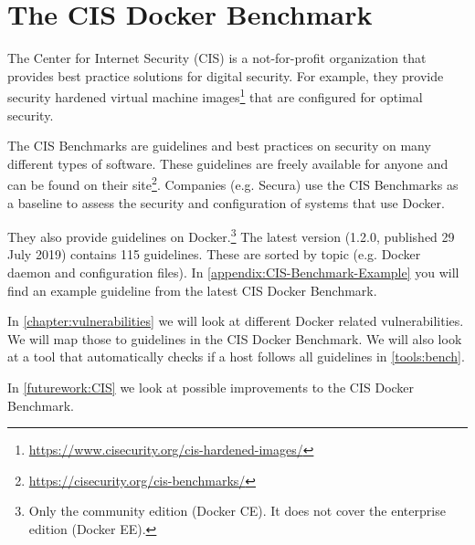 \section{The CIS Docker Benchmark}
The Center for Internet Security (CIS) is a not-for-profit organization that provides best practice solutions for digital security. For example, they provide security hardened virtual machine images\footnote{\url{https://www.cisecurity.org/cis-hardened-images/}} that are configured for optimal security.

\medskip

The CIS Benchmarks are guidelines and best practices on security on many different types of software. These guidelines are freely available for anyone and can be found on their site\footnote{\url{https://cisecurity.org/cis-benchmarks/}}. Companies (e.g. Secura) use the CIS Benchmarks as a baseline to assess the security and configuration of systems that use Docker.

\medskip

They also provide guidelines on Docker.\footnote{Only the community edition (Docker CE). It does not cover the enterprise edition (Docker EE).} The latest version (1.2.0, published 29 July 2019) contains 115 guidelines. These are sorted by topic (e.g. Docker daemon and configuration files). In \autoref{appendix:CIS-Benchmark-Example} you will find an example guideline from the latest CIS Docker Benchmark.

In \autoref{chapter:vulnerabilities} we will look at different Docker related vulnerabilities. We will map those to guidelines in the CIS Docker Benchmark. We will also look at a tool that automatically checks if a host follows all guidelines in \autoref{tools:bench}.

In \autoref{futurework:CIS} we look at possible improvements to the CIS Docker Benchmark.
